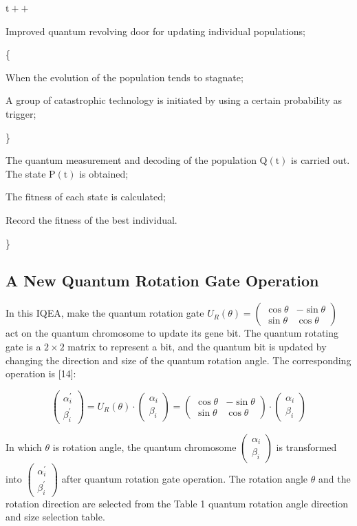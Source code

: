 \documentclass[10pt]{article}
\begin{document}
$\mathrm{t++}$

Improved quantum revolving door for updating individual populations;

\{

When the evolution of the population tends to stagnate;

A group of catastrophic technology is initiated by using a certain probability as trigger;

\}

The quantum measurement and decoding of the population $\mathrm{Q}(\mathrm{t})$ is carried out. The state $\mathrm{P}(\mathrm{t})$ is obtained;

The fitness of each state is calculated;

Record the fitness of the best individual.

\}

\subsection{A New Quantum Rotation Gate Operation}
In this IQEA, make the quantum rotation gate $U_{R}(\theta)=\left(\begin{array}{cc}\cos \theta & -\sin \theta \\ \sin \theta & \cos \theta\end{array}\right)$ act on the quantum chromosome to update its gene bit. The quantum rotating gate is a $2 \times 2$ matrix to represent a bit, and the quantum bit is updated by changing the direction and size of the quantum rotation angle. The corresponding operation is [14]:

$$
\left(\begin{array}{c}
\alpha_{i}^{\prime} \\
\beta_{i}^{\prime}
\end{array}\right)=U_{R}(\theta) \cdot\left(\begin{array}{c}
\alpha_{i} \\
\beta_{i}
\end{array}\right)=\left(\begin{array}{cc}
\cos \theta & -\sin \theta \\
\sin \theta & \cos \theta
\end{array}\right) \cdot\left(\begin{array}{c}
\alpha_{i} \\
\beta_{i}
\end{array}\right)
$$

In which $\theta$ is rotation angle, the quantum chromosome $\left(\begin{array}{c}\alpha_{i} \\ \beta_{i}\end{array}\right)$ is transformed into $\left(\begin{array}{l}\alpha_{i}^{\prime} \\ \beta_{i}^{\prime}\end{array}\right)$ after quantum rotation gate operation. The rotation angle $\theta$ and the rotation direction are selected from the Table 1 quantum rotation angle direction and size selection table.
\end{document}
